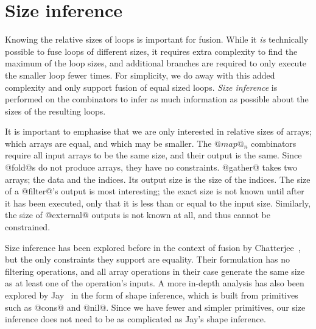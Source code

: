 \section{Size inference}

Knowing the relative sizes of loops is important for fusion.
While it \emph{is} technically possible to fuse loops of different sizes, it requires extra complexity to find the maximum of the loop sizes, and additional branches are required to only execute the smaller loop fewer times. For simplicity, we do away with this added complexity and only support fusion of equal sized loops. \emph{Size inference} is performed on the combinators to infer as much information as possible about the sizes of the resulting loops.

It is important to emphasise that we are only interested in relative sizes of arrays; which arrays are equal, and which may be smaller.
The $@map@_n$ combinators require all input arrays to be the same size, and their output is the same.
Since @fold@s do not produce arrays, they have no constraints.
@gather@ takes two arrays; the data and the indices. Its output size is the size of the indices.
The size of a @filter@'s output is most interesting; the exact size is not known until after it has been executed, only that it is less than or equal to the input size.
Similarly, the size of @external@ outputs is not known at all, and thus cannot be constrained.

Size inference has been explored before in the context of fusion by Chatterjee~\cite{chatterjee1991size}, but the only constraints they support are equality.
Their formulation has no filtering operations, and all array operations in their case generate the same size as at least one of the operation's inputs.
A more in-depth analysis has also been explored by Jay~\cite{jay1996shape} in the form of shape inference, which is built from primitives such as @cons@ and @nil@.
Since we have fewer and simpler primitives, our size inference does not need to be as complicated as Jay's shape inference.


